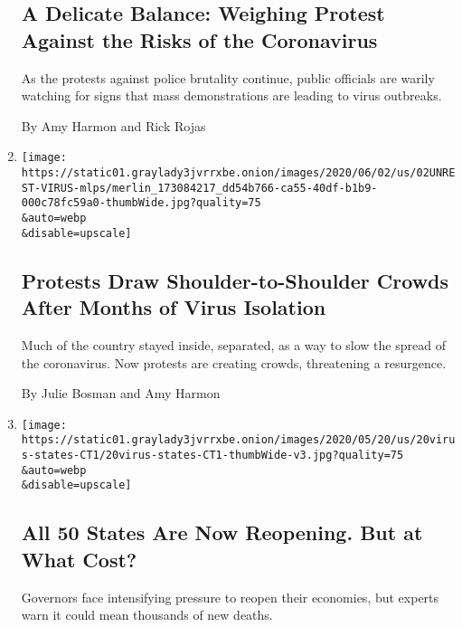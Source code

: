 \begin{enumerate}
  \hypertarget{a-delicate-balance-weighing-protest-against-the-risks-of-the-coronavirus}{%
  \subsection{A Delicate Balance: Weighing Protest Against the Risks of
  the
  Coronavirus}\label{a-delicate-balance-weighing-protest-against-the-risks-of-the-coronavirus}}

  As the protests against police brutality continue, public officials
  are warily watching for signs that mass demonstrations are leading to
  virus outbreaks.

  By Amy Harmon and Rick Rojas
\item
  \href{/2020/06/02/us/coronavirus-protests-george-floyd.html}{}

  \texttt{[image: https://static01.graylady3jvrrxbe.onion/images/2020/06/02/us/02UNREST-VIRUS-mlps/merlin\_173084217\_dd54b766-ca55-40df-b1b9-000c78fc59a0-thumbWide.jpg?quality=75\\\&auto=webp\\\&disable=upscale]}

  \hypertarget{protests-draw-shoulder-to-shoulder-crowds-after-months-of-virus-isolation}{%
  \subsection{Protests Draw Shoulder-to-Shoulder Crowds After Months of
  Virus
  Isolation}\label{protests-draw-shoulder-to-shoulder-crowds-after-months-of-virus-isolation}}

  Much of the country stayed inside, separated, as a way to slow the
  spread of the coronavirus. Now protests are creating crowds,
  threatening a resurgence.

  By Julie Bosman and Amy Harmon
\item
  \href{/2020/05/20/us/coronavirus-reopening-50-states.html}{}

  \texttt{[image: https://static01.graylady3jvrrxbe.onion/images/2020/05/20/us/20virus-states-CT1/20virus-states-CT1-thumbWide-v3.jpg?quality=75\\\&auto=webp\\\&disable=upscale]}

  \hypertarget{all-50-states-are-now-reopening-but-at-what-cost}{%
  \subsection{All 50 States Are Now Reopening. But at What
  Cost?}\label{all-50-states-are-now-reopening-but-at-what-cost}}

  Governors face intensifying pressure to reopen their economies, but
  experts warn it could mean thousands of new deaths.


\end{enumerate}
